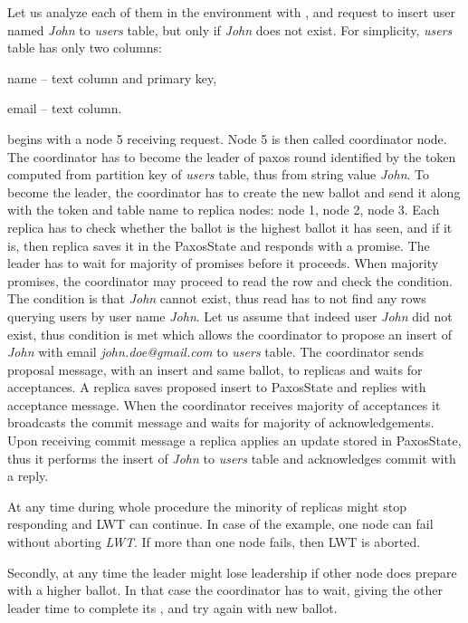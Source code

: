 Let us analyze each of them in the environment with ,  and request to insert user named \emph{John} to \emph{users} table, but only if \emph{John} does not exist. For simplicity, \emph{users} table has only two columns: \begin{enumerate*} 
\item name -- text column and primary key, \item email -- text column. \end{enumerate*} \lwt begins with a node 5 receiving request. Node 5 is then called coordinator node. The coordinator has to become the leader of paxos round identified by the token computed from partition key of \emph{users} table, thus from string value \emph{John}. To become the leader, the coordinator has to create the new ballot and send it along with the token and table name to replica nodes: node 1, node 2, node 3. Each replica has to check whether the ballot is the highest ballot it has seen, and if it is, then replica saves it in the PaxosState and responds with a promise. The leader has to wait for majority of promises before it proceeds. When majority promises, the coordinator may proceed to read the row and check the condition. The condition is that \emph{John} cannot exist, thus read has to not find any rows querying users by user name \emph{John}. Let us assume that indeed user \emph{John} did not exist, thus condition is met which allows the coordinator to propose an insert of \emph{John} with email \emph{john.doe@gmail.com} to \emph{users} table. The coordinator sends proposal message, with an insert and same ballot, to replicas and waits for acceptances. A replica saves proposed insert to PaxosState and replies with acceptance message.
When the coordinator receives majority of acceptances it broadcasts the commit message and waits for majority of acknowledgements. Upon receiving commit message a replica applies an update stored in PaxosState, thus it performs the insert of \emph{John} to \emph{users} table and acknowledges commit with a reply.

At any time during whole procedure the minority of replicas might stop responding and LWT can continue. In case of the example, one node can fail without aborting \emph{LWT}. If more than one node fails, then LWT is aborted. 

Secondly, at any time the leader might lose leadership if other node does prepare with a higher ballot. In that case the coordinator has to wait, giving the other leader time to complete its \lwt, and try again with new ballot.

